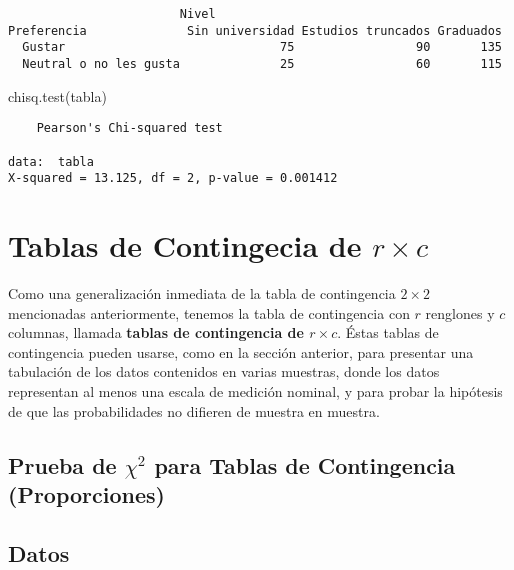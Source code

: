 \documentclass[
  a4paper,
  oneside,
  openany]{book}
\newenvironment{Shaded}{\begin{snugshade}}{\end{snugshade}}
\newcommand{\FunctionTok}[1]{\textcolor[rgb]{0.00,0.00,0.00}{#1}}
\newcommand{\NormalTok}[1]{#1}
\begin{document}
\begin{verbatim}
                        Nivel
Preferencia              Sin universidad Estudios truncados Graduados
  Gustar                              75                 90       135
  Neutral o no les gusta              25                 60       115
\end{verbatim}

\begin{Shaded}
\begin{Highlighting}[]
\FunctionTok{chisq.test}\NormalTok{(tabla)}
\end{Highlighting}
\end{Shaded}

\begin{verbatim}
    Pearson's Chi-squared test

data:  tabla
X-squared = 13.125, df = 2, p-value = 0.001412
\end{verbatim}

\hypertarget{tablas-de-contingecia-de-r-times-c}{%
\chapter{\texorpdfstring{Tablas de Contingecia de \(r \times c\)}{Tablas de Contingecia de r \textbackslash times c}}\label{tablas-de-contingecia-de-r-times-c}}

Como una generalización inmediata de la tabla de contingencia \(2 \times 2\) mencionadas anteriormente, tenemos la tabla de contingencia con \(r\) renglones y \(c\) columnas, llamada \textbf{tablas de contingencia de \(r \times c\)}.
Éstas tablas de contingencia pueden usarse, como en la sección anterior, para presentar una tabulación de los datos contenidos en varias muestras, donde los datos representan al menos una escala de medición nominal, y para probar la hipótesis de que las probabilidades no difieren de muestra en muestra.

\hypertarget{prueba-de-chi2-para-tablas-de-contingencia-proporciones}{%
\section*{\texorpdfstring{Prueba de \(\chi^2\) para Tablas de Contingencia (Proporciones)}{Prueba de \textbackslash chi\^{}2 para Tablas de Contingencia (Proporciones)}}\label{prueba-de-chi2-para-tablas-de-contingencia-proporciones}}


\hypertarget{datos-12}{%
\section{Datos}\label{datos-12}}
\end{document}
